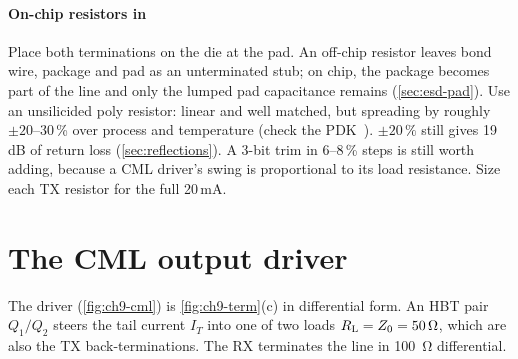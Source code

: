 \paragraph{On-chip resistors in \sgx{}} Place both terminations on the die at the pad. An off-chip resistor leaves bond wire, package and pad as an unterminated stub; on chip, the package becomes part of the line and only the lumped pad capacitance remains (\cref{sec:esd-pad}). Use an unsilicided poly resistor: linear and well matched, but spreading by roughly $\pm20$--30\,\% over process and temperature (check the PDK~\cite{ihppdk}). $\pm20\,\%$ still gives 19\,dB of return loss (\cref{sec:reflections}). A 3-bit trim in 6--8\,\% steps is still worth adding, because a CML driver's swing is proportional to its load resistance. Size each TX resistor for the full 20\,mA.

\section{The CML output driver}\label{sec:cml-driver}

The \OS{} driver (\cref{fig:ch9-cml}) is \cref{fig:ch9-term}(c) in differential form. An HBT pair $Q_1/Q_2$ steers the tail current $I_T$ into one of two loads $R_\mathrm{L}=Z_0=\qty{50}{\ohm}$, which are also the TX back-terminations. The RX terminates the line in \qty{100}{\ohm} differential.

